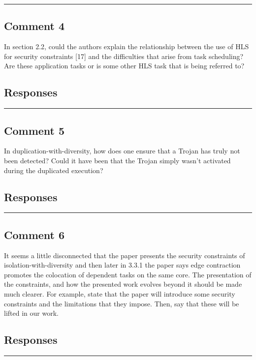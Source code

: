 \documentclass[10pt,journal, compsoc]{IEEEtran}
\begin{document}
\noindent\rule[0.25\baselineskip]{252pt}{1pt}

\subsection*{Comment 4}
In section 2.2, could the authors explain the relationship between the use of HLS for security constraints [17] and the difficulties that arise from task scheduling?  Are these application tasks or is some other HLS task that is being referred to?

\subsection*{Responses}


\noindent\rule[0.25\baselineskip]{252pt}{1pt}

\subsection*{Comment 5}
In duplication-with-diversity, how does one ensure that a Trojan has truly not been detected?  Could it have been that the Trojan simply wasn’t activated during the duplicated execution?

\subsection*{Responses}


\noindent\rule[0.25\baselineskip]{252pt}{1pt}

\subsection*{Comment 6}
It seems a little disconnected that the paper presents the security constraints of isolation-with-diversity and then later in 3.3.1 the paper says edge contraction promotes the colocation of dependent tasks on the same core.  The presentation of the constraints, and how the presented work evolves beyond it should be made much clearer. For example, state that the paper will introduce some security constraints and the limitations that they impose.  Then, say that these will be lifted in our work.

\subsection*{Responses}


\noindent\rule[0.25\baselineskip]{252pt}{1pt}
\end{document}
